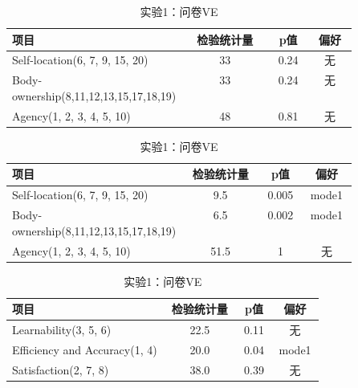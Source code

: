 \clearpage
\begin{table}[t]
    \centering
    \begin{minipage}{\textwidth}
        \centering
        \caption{实验1：问卷EC}
        \label{tab:5.4-1}
        \begin{tabular}{@{}p{0.5\linewidth}ccc@{}}
            \toprule
            \textbf{项目}                            & \textbf{检验统计量} & \textbf{p值} & \textbf{偏好} \\ \midrule
            Self-location(6, 7, 9, 15, 20)         & 33              & 0.24         & 无           \\
            Body-ownership(8,11,12,13,15,17,18,19) & 33              & 0.24         & 无           \\
            Agency(1, 2, 3, 4, 5, 10)              & 48              & 0.81         & 无           \\ \bottomrule
        \end{tabular}
    \end{minipage}

    \vspace{0.5cm}

    \begin{minipage}{\textwidth}
        \centering
        \caption{实验2：问卷EC}
        \begin{tabular}{@{}p{0.5\linewidth}ccc@{}}
            \toprule
            \textbf{项目}                            & \textbf{检验统计量} & \textbf{p值} & \textbf{偏好} \\ \midrule
            Self-location(6, 7, 9, 15, 20)         & 9.5             & 0.005        & mode1       \\
            Body-ownership(8,11,12,13,15,17,18,19) & 6.5             & 0.002        & mode1       \\
            Agency(1, 2, 3, 4, 5, 10)              & 51.5            & 1            & 无           \\ \bottomrule
        \end{tabular}
    \end{minipage}

    \vspace{0.5cm}

    \begin{minipage}{\textwidth}
        \centering
        \caption{实验1：问卷VE}
        \begin{tabular}{@{}p{0.5\linewidth}ccc@{}}
            \toprule
            \textbf{项目}                 & \textbf{检验统计量} & \textbf{p值} & \textbf{偏好} \\ \midrule
            Learnability(3, 5, 6)         & 22.5            & 0.11         & 无           \\
            Efficiency and Accuracy(1, 4) & 20.0            & 0.04         & mode1       \\
            Satisfaction(2, 7, 8)         & 38.0            & 0.39         & 无           \\ \bottomrule
        \end{tabular}
    \end{minipage}


\end{table}
